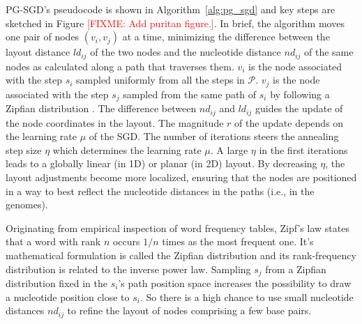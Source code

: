\documentclass{bioinfo}
\theoremstyle{definition}
\newcommand{\red}[1]{{\textcolor{Red}{#1}}}
\newcommand{\FIXME}[1]{\red{[FIXME: #1]}}
\begin{document}
	PG-SGD's pseudocode is shown in Algorithm~\ref{alg:pg_sgd} and key steps are sketched in Figure \FIXME{Add puritan figure.}.
	In brief, the algorithm moves one pair of nodes $( v_i, v_j )$ at a time, minimizing the difference between the layout distance $ld_{ij}$ of the two nodes and the nucleotide distance $nd_{ij}$ of the same nodes as calculated along a path that traverses them.
	$v_i$ is the node associated with the step $s_i$ sampled uniformly from all the steps in $\mathcal{P}$.
	$v_j$ is the node associated with the step $s_j$ sampled from the same path of $s_i$ by following a Zipfian distribution \citep{Zipf1932}.
	The difference between $nd_{ij}$ and $ld_{ij}$ guides the update of the node coordinates in the layout.
	The magnitude $r$ of the update depends on the learning rate $\mu$ of the SGD.
	The number of iterations steers the annealing step size $\eta$ which determines the learning rate $\mu$.
	A large $\eta$ in the first iterations leads to a globally linear (in 1D) or planar (in 2D) layout.
	By decreasing $\eta$, the layout adjustments become more localized, ensuring that the nodes are positioned in a way to best reflect the nucleotide distances in the paths (i.e., in the genomes). %
	
	


	Originating from empirical inspection of word frequency tables, Zipf's law states that a word with rank $n$ occurs $1/n$ times as the most frequent one.
	It's mathematical formulation is called the Zipfian distribution and its rank-frequency distribution is related to the inverse power law.
	Sampling $s_j$ from a Zipfian distribution fixed in the $s_i$'s path position space increases the possibility to draw a nucleotide position close to $s_i$.
	So there is a high chance to use small nucleotide distances $nd_{ij}$ to refine the layout of nodes comprising a few base pairs.
\end{document}

